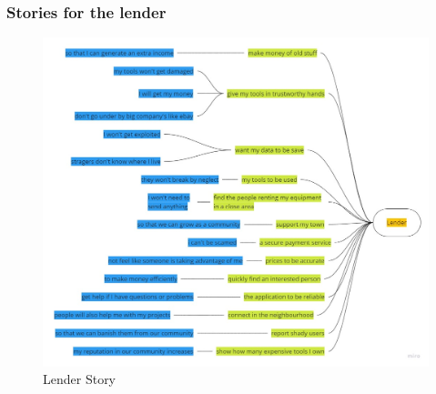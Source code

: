 \subsubsection{Stories for the lender}
\begin{figure}[H]
	\centering
	\includegraphics[width=\linewidth]{abb/2_context_of_use/story_lending.jpg}
	\caption{Lender Story}
	\label{fig:story_lender}
\end{figure}

